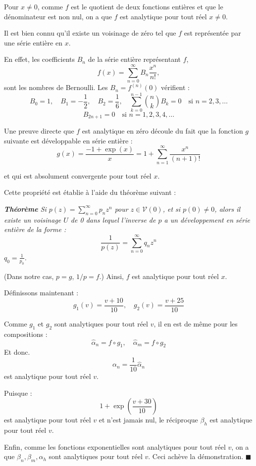	Pour $x \neq 0$, comme $f$ est le quotient de deux fonctions entières et que le dénominateur est non nul, on a que $f$ est analytique pour tout réel $x \neq 0$.
	
	Il est bien connu qu'il existe un voisinage de zéro tel que $f$ est représentée par une série entière en $x$. 

	En effet, les coefficients $B_n$ de la série entière représentant $f$, 
	\[
	f(x) = \sum_{n=0}^{\infty} B_n \frac{x^n}{n!},
	\]
	sont les nombres de Bernoulli. 
	Les $B_n = f^{(n)}(0)$ vérifient :
	\[
	B_0 = 1, \quad B_1 = -\frac{1}{2}, \quad B_2 = \frac{1}{6}, \quad \sum_{k=0}^{n-1} \binom{n}{k} B_k = 0 \quad \text{si } n = 2,3,\ldots
	\]
	\[
	B_{2n+1} = 0 \quad \text{si } n = 1, 2, 3, 4, \ldots
	\]

	Une preuve directe que $f$ est analytique en zéro découle du fait que la fonction $g$ suivante est développable en série entière : 
	\[
	g(x) = \frac{-1 + \exp(x)}{x} = 1 + \sum_{n=1}^{\infty} \frac{x^n}{(n+1)!}
	\]
	
	et qui est absolument convergente pour tout réel $x$.
	
	Cette propriété est établie à l'aide du théorème suivant :
	
	\textit{\textbf{Théorème} Si $p(z) = \sum_{n=0}^{\infty} p_n z^n$ pour $z \in \mathcal{V}(0)$, et si $p(0) \neq 0$, alors il existe un voisinage $U$ de 0 dans lequel l'inverse de $p$ a un développement en série entière de la forme :
		\[
		\frac{1}{p(z)} = \sum_{n=0}^{\infty} q_n z^n
		\]
		\quad {} \quad $q_0 = \frac{1}{p_0}$.
	}
	
	(Dans notre cas, $p = g$, $1/p = f$.) Ainsi, $f$ est analytique pour tout réel $x$.

	Définissons maintenant :
	\[
	g_1(v) = \frac{v + 10}{10}, \quad g_2(v) = \frac{v + 25}{10}
	\]
	
	Comme $g_1$ et $g_2$ sont analytiques pour tout réel $v$, il en est de même pour les compositions :
	\[
	\hat{\alpha}_n = f \circ g_1, \quad \hat{\alpha}_m = f \circ g_2
	\]
	Et donc.
	\[
	\alpha_n = \frac{1}{10} \hat{\alpha}_n
	\]
	est analytique pour tout réel $v$.

	Puisque :
	\[
	1 + \exp\left(\frac{v + 30}{10}\right)
	\]
	est analytique pour tout réel $v$ et n'est jamais nul, le réciproque $\beta_h$ est analytique pour tout réel $v$.
	
	Enfin, comme les fonctions exponentielles sont analytiques pour tout réel $v$, on a que $\beta_n, \beta_m, \alpha_h$ sont analytiques pour tout réel $v$. Ceci achève la démonstration. $\blacksquare$
	
